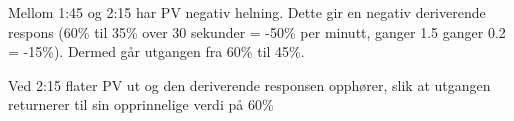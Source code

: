 Mellom 1:45 og 2:15 har PV negativ helning. Dette gir en negativ deriverende respons (60\% til 35\% over 30 sekunder = -50\% per minutt, ganger 1.5 ganger 0.2 = -15\%). Dermed går utgangen fra 60\% til 45\%.

Ved 2:15 flater PV ut og den deriverende responsen opphører, slik at utgangen returnerer til sin opprinnelige verdi på 60\%







 


